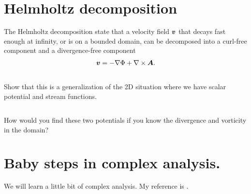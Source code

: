 \documentclass[11pt,letterpaper]{article}
\begin{document}
\section{Helmholtz decomposition}
The Helmholtz decomposition state that a velocity field $\boldsymbol{v}$ that decays fast enough at infinity, or is on a bounded domain, can be decomposed into a curl-free component and a divergence-free component \parencite{Petrascheck_15}
\begin{align}
    \boldsymbol{v} = -\nabla\Phi+\nabla\times \boldsymbol{A}. 
\end{align}

\subsection{}
Show that this is a generalization of the 2D situation where we have scalar potential and stream functions. 

\subsection{}
How would you find these two potentials if you know the divergence and vorticity in the domain?

\section{Baby steps in complex analysis. }
We will learn a little bit of complex analysis. My reference is \cite{SteinShakarchi_10}. 





    
\vfill
\printbibliography
\end{document}
